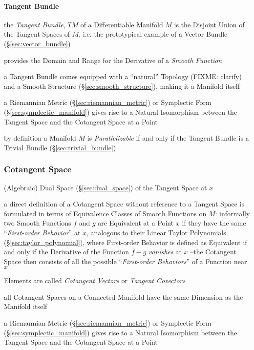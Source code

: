 \paragraph{Tangent Bundle}\label{sec:tangent_bundle}\hfill

the \emph{Tangent Bundle}, $T M$ of a Differentiable Manifold $M$ is the
Disjoint Union of the Tangent Spaces of $M$, i.e. the prototypical example of a
Vector Bundle (\S\ref{sec:vector_bundle})

provides the Domain and Range for the Derivative of a \emph{Smooth Function}

a Tangent Bundle comes equipped with a ``natural'' Topology (FIXME: clarify)
and a Smooth Structure (\S\ref{sec:smooth_structure}), making it a Manifold
itself

a Riemannian Metric (\S\ref{sec:riemannian_metric}) or Symplectic Form
(\S\ref{sec:symplectic_manifold}) gives rise to a Natural Isomorphism between
the Tangent Space and the Cotangent Space at a Point

by definition a Manifold $M$ is \emph{Parallelizable} if and only if the
Tangent Bundle is a Trivial Bundle (\S\ref{sec:trivial_bundle})



\subsubsection{Cotangent Space}\label{sec:cotangent_space}

(Algebraic) Dual Space (\S\ref{sec:dual_space}) of the Tangent Space at $x$

a direct definition of a Cotangent Space without reference to a Tangent Space
is formulated in terms of Equivalence Classes of Smooth Functions on $M$:
informally two Smooth Functions $f$ and $g$ are Equivalent at a Point $x$ if
they have the same ``\emph{First-order Behavior}'' at $x$, analogous to their
Linear Taylor Polynomials (\S\ref{sec:taylor_polynomial}), where First-order
Behavior is defined as Equivalent if and only if the Derivative of the Function
$f-g$ \emph{vanishes} at $x$ --the Cotangent Space then consists of all the
possible ``\emph{First-order Behaviors}'' of a Function near $x$

Elements are called \emph{Cotangent Vectors} or \emph{Tangent Covectors}

all Cotangent Spaces on a Connected Manifold have the same Dimension as the
Manifold itself

a Riemannian Metric (\S\ref{sec:riemannian_metric}) or Symplectic Form
(\S\ref{sec:symplectic_manifold}) gives rise to a Natural Isomorphism between
the Tangent Space and the Cotangent Space at a Point




